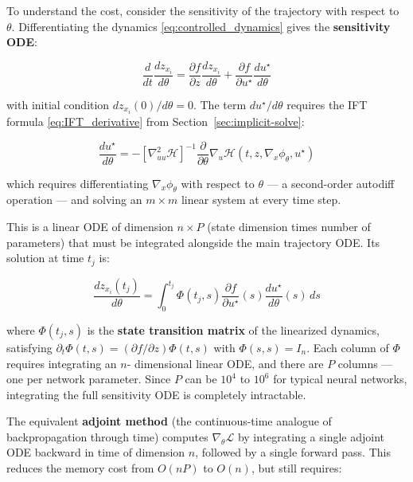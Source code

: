 \documentclass{article}
\begin{document}
To understand the cost, consider the sensitivity of the trajectory with respect
to $\theta$. Differentiating the dynamics \eqref{eq:controlled_dynamics} gives
the \textbf{sensitivity ODE}:

\begin{equation}
    \frac{d}{dt}\frac{dz_{x_i}}{d\theta}
    = \frac{\partial f}{\partial z}
    \frac{dz_{x_i}}{d\theta}
    + \frac{\partial f}{\partial u^\star}
    \frac{du^\star}{d\theta}
    \label{eq:sensitivity_ode}
\end{equation}

with initial condition $dz_{x_i}(0)/d\theta = 0$. The term
$du^\star/d\theta$ requires the IFT formula \eqref{eq:IFT_derivative} from
Section~\ref{sec:implicit-solve}:

\begin{equation}
    \frac{du^\star}{d\theta}
    = -\left[\nabla^2_{uu}\mathcal{H}\right]^{-1}
    \frac{\partial}{\partial\theta}
    \nabla_u\mathcal{H}(t, z, \nabla_x\phi_\theta, u^\star)
    \label{eq:dustar_dtheta}
\end{equation}

which requires differentiating $\nabla_x\phi_\theta$ with respect to $\theta$
--- a second-order autodiff operation --- and solving an $m \times m$ linear
system at every time step.

This is a linear
ODE of dimension $n \times P$ (state dimension times number of parameters)
that must be integrated alongside the main trajectory ODE. Its solution at time
$t_j$ is:

\begin{equation}
    \frac{dz_{x_i}(t_j)}{d\theta}
    = \int_0^{t_j} \Phi(t_j, s)
    \frac{\partial f}{\partial u^\star}(s)
    \frac{du^\star}{d\theta}(s)\, ds
    \label{eq:sensitivity_integral}
\end{equation}

where $\Phi(t_j, s)$ is the \textbf{state transition matrix} of the linearized
dynamics, satisfying $\partial_t\Phi(t,s) = (\partial f/\partial z)\Phi(t,s)$
with $\Phi(s,s) = I_n$. Each column of $\Phi$ requires integrating an $n$-
dimensional linear ODE, and there are $P$ columns --- one per network parameter.
Since $P$ can be $10^4$ to $10^6$ for typical neural networks, integrating the
full sensitivity ODE is completely intractable.

The equivalent \textbf{adjoint method} (the continuous-time analogue of
backpropagation through time) computes $\nabla_\theta\mathcal{L}$ by integrating
a single adjoint ODE backward in time of dimension $n$, followed by a single
forward pass. This reduces the memory cost from $O(nP)$ to $O(n)$, but still
requires:
\end{document}
